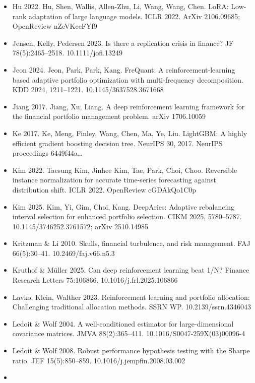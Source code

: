 \documentclass[12pt,a4paper]{report}
\begin{document}
\begin{itemize}
  Hu \& Gu 2024. Markowitz Meets Bellman: Knowledge-distilled
  reinforcement learning for portfolio management. arXiv 2405.05449
\item
  Hu 2022. Hu, Shen, Wallis, Allen-Zhu, Li, Wang, Wang, Chen. LoRA:
  Low-rank adaptation of large language models. ICLR 2022. ArXiv
  2106.09685; OpenReview nZeVKeeFYf9
\item
  Jensen, Kelly, Pedersen 2023. Is there a replication crisis in
  finance? JF 78(5):2465--2518. 10.1111/jofi.13249
\item
  Jeon 2024. Jeon, Park, Park, Kang. FreQuant: A reinforcement-learning
  based adaptive portfolio optimization with multi-frequency
  decomposition. KDD 2024, 1211--1221. 10.1145/3637528.3671668
\item
  Jiang 2017. Jiang, Xu, Liang. A deep reinforcement learning framework
  for the financial portfolio management problem. arXiv 1706.10059
\item
  Ke 2017. Ke, Meng, Finley, Wang, Chen, Ma, Ye, Liu. LightGBM: A highly
  efficient gradient boosting decision tree. NeurIPS 30, 2017. NeurIPS
  proceedings 6449f44a\ldots{}
\item
  Kim 2022. Taesung Kim, Jinhee Kim, Tae, Park, Choi, Choo. Reversible
  instance normalization for accurate time-series forecasting against
  distribution shift. ICLR 2022. OpenReview cGDAkQo1C0p
\item
  Kim 2025. Kim, Yi, Gim, Choi, Kang. DeepAries: Adaptive rebalancing
  interval selection for enhanced portfolio selection. CIKM 2025,
  5780--5787. 10.1145/3746252.3761572; arXiv 2510.14985
\item
  Kritzman \& Li 2010. Skulls, financial turbulence, and risk
  management. FAJ 66(5):30--41. 10.2469/faj.v66.n5.3
\item
  Kruthof \& Müller 2025. Can deep reinforcement learning beat 1/N?
  Finance Research Letters 75:106866. 10.1016/j.frl.2025.106866
\item
  Lavko, Klein, Walther 2023. Reinforcement learning and portfolio
  allocation: Challenging traditional allocation methods. SSRN WP.
  10.2139/ssrn.4346043
\item
  Ledoit \& Wolf 2004. A well-conditioned estimator for
  large-dimensional covariance matrices. JMVA 88(2):365--411.
  10.1016/S0047-259X(03)00096-4
\item
  Ledoit \& Wolf 2008. Robust performance hypothesis testing with the
  Sharpe ratio. JEF 15(5):850--859. 10.1016/j.jempfin.2008.03.002
\item

\end{itemize}
\end{document}
